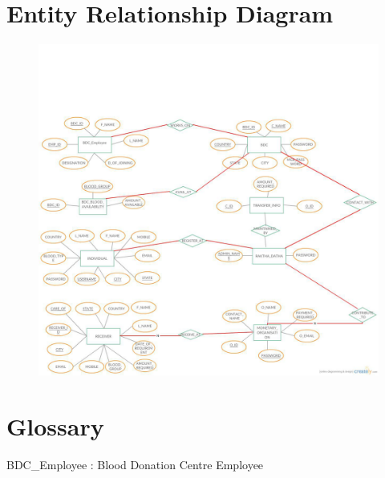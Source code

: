 \section{Entity Relationship Diagram}
\begin{figure}[htb]
\centering
\includegraphics[scale=0.3]{./er} %
\label{fig:label} %
\end{figure}

\section{Glossary}
BDC_Employee : Blood Donation Centre Employee
